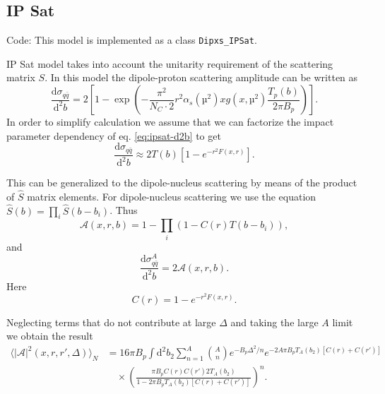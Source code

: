 \documentclass[a4paper,12pt]{article}
\newcommand{\code}[1]{\texttt{#1}}
\newcommand{\der}{\mathrm{d}}
\newcommand{\A}{\mathcal{A}}
\begin{document}
\subsection{IP Sat}
\label{ipsat}
Code: This model is implemented as a class \code{Dipxs\_IPSat}.

IP Sat model takes into account the unitarity requirement of the scattering matrix $S$. In this model the dipole-proton scattering amplitude can be written as \cite{PhysRevD.68.114005}
\begin{equation}
	\label{eq:ipsat-d2b}
	\frac{\der \sigma_{q\bar q}}{\der^2 b} = 2\left[1- \exp \left(-\frac{\pi^2}{N_C\cdot 2}r^2 \alpha_s(µ^2)xg(x,µ^2) \frac{T_p(b)}{2\pi B_p} \right) \right].
\end{equation}
In order to simplify calculation we assume that we can factorize the impact parameter dependency of eq. \eqref{eq:ipsat-d2b} to get
\begin{equation}
	\label{eq:ipsat-d2b-f}
	\frac{\der \sigma_{q\bar q}}{\der^2 b} \approx 2T(b) \left[1 - e^{-r^2F(x,r)} \right].
\end{equation}

This can be generalized to the dipole-nucleus scattering by means of the product of $\hat S$ matrix elements. For dipole-nucleus scattering we use the equation $\hat S(b) = \prod_i \hat S(b-b_i)$. Thus
\begin{equation}
	\label{eq:ipsat-a}
	\A(x,r,b) = 1 - \prod_i \left( 1-C(r)T(b-b_i) \right),
\end{equation}
and
\begin{equation}
	\frac{\der \sigma_{q\bar q}^A}{\der^2 b} = 2\A(x,r,b).
\end{equation}
Here
\begin{equation}
	C(r) = 1-e^{-r^2F(x,r)}.
\end{equation}

Neglecting terms that do not contribute at large $\Delta$ and taking the large $A$ limit we obtain the result
\begin{equation}
\label{eq:ipsat-asqr}
\begin{split}
	\langle |\A|^2(x,r,r',\Delta) \rangle_N &= 16\pi B_p \int \der^2 b_2 \sum_{n=1}^A \binom{A}{n} e^{-B_p \Delta^2/n} e^{-2A\pi B_p T_A(b_2)[C(r)+C(r')]} \\
	&\quad \times \left(\frac{\pi B_p C(r)C(r') 2 T_A(b_2)}{1-2\pi B_p T_A(b_2)[C(r)+C(r')]}\right)^n.
\end{split}
\end{equation}
\end{document}
